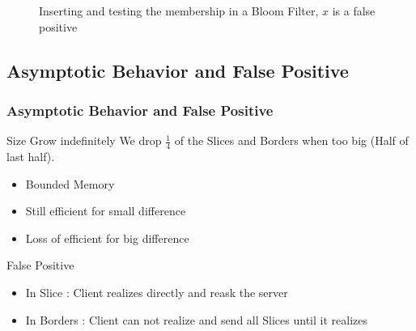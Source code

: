 \documentclass[10pt,xcolor={usenames,dvipsnames,svgnames,table}]{beamer}
\theoremstyle{definition}
\theoremstyle{definition}
\begin{document}
\begin{frame}
\begin{figure}[H]
{
}
\caption{Inserting and testing the membership in a Bloom Filter, $x$ is a false positive} \label{fig:fp}
\end{figure}
\end{frame}

\subsection{Asymptotic Behavior and False Positive}
\frametitle{Asymptotic Behavior and False Positive}
\begin{frame}
 \begin{alertblock}{Size Grow indefinitely}
  We drop $\frac{1}{4}$ of the Slices and Borders when too big (Half of last half). 
  \begin{itemize}
   \item Bounded Memory
   \item Still efficient for small difference
   \item Loss of efficient for big difference
  \end{itemize}
 \end{alertblock}
 \begin{alertblock}{False Positive}
 \begin{itemize}
  \item In Slice : Client realizes directly and reask the server
  \item In Borders : Client can not realize and send all Slices until it realizes
 \end{itemize}

\end{alertblock}
\end{frame}
\end{document}
